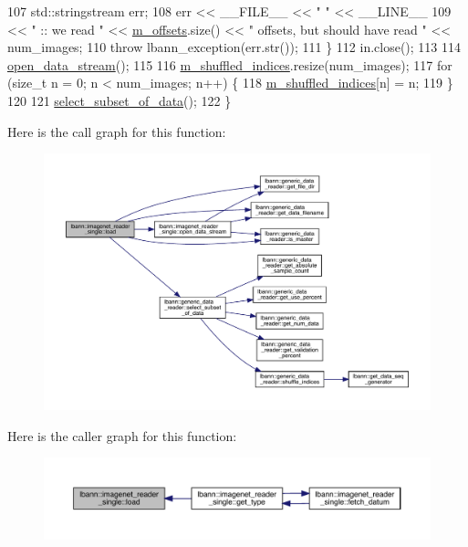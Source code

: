 \begin{DoxyCode}
107     std::stringstream err;
108     err << \_\_FILE\_\_ << \textcolor{stringliteral}{" "} << \_\_LINE\_\_
109         << \textcolor{stringliteral}{" ::  we read "} << \hyperlink{classlbann_1_1imagenet__reader__single_a605ba53f4e3fa02a4fced38d41465a10}{m\_offsets}.size() << \textcolor{stringliteral}{" offsets, but should have read "} << num\_images;
110     \textcolor{keywordflow}{throw} lbann\_exception(err.str());
111   \}
112   in.close();
113 
114   \hyperlink{classlbann_1_1imagenet__reader__single_a8db14d15bfc2de92ffb3c20f1a38dd00}{open\_data\_stream}();
115 
116   \hyperlink{classlbann_1_1generic__data__reader_aaab6aeff67ffff1c689336851fec2c57}{m\_shuffled\_indices}.resize(num\_images);
117   \textcolor{keywordflow}{for} (\textcolor{keywordtype}{size\_t} n = 0; n < num\_images; n++) \{
118     \hyperlink{classlbann_1_1generic__data__reader_aaab6aeff67ffff1c689336851fec2c57}{m\_shuffled\_indices}[n] = n;
119   \}
120 
121   \hyperlink{classlbann_1_1generic__data__reader_aa28fdeeb6af492540f507e49adff5d6c}{select\_subset\_of\_data}();
122 \}
\end{DoxyCode}
Here is the call graph for this function\+:\nopagebreak
\begin{figure}[H]
\begin{center}
\leavevmode
\includegraphics[width=350pt]{classlbann_1_1imagenet__reader__single_a7ea768d9784b7a9532551d7402ee4f8e_cgraph}
\end{center}
\end{figure}
Here is the caller graph for this function\+:\nopagebreak
\begin{figure}[H]
\begin{center}
\leavevmode
\includegraphics[width=350pt]{classlbann_1_1imagenet__reader__single_a7ea768d9784b7a9532551d7402ee4f8e_icgraph}
\end{center}
\end{figure}
